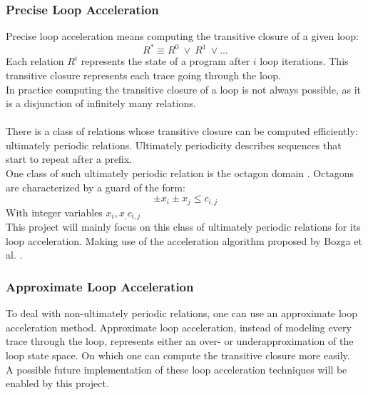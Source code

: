 \documentclass{article}
\begin{document}
\subsubsection{Precise Loop Acceleration}
Precise loop acceleration means computing the transitive closure of a given loop:
\begin{equation*}
	R^* \equiv R^0\ \lor\ R^1\ \lor ...
\end{equation*}
Each relation $R^i$ represents the state of a program after $i$ loop iterations. 
This transitive closure represents each trace going through the loop. \\
In practice computing the transitive closure of a loop is not always possible, as it is a disjunction of infinitely many relations. \\ \\
There is a class of relations whose transitive closure can be computed efficiently: ultimately periodic relations.
Ultimately periodicity describes sequences that start to repeat after a prefix. \\
One class of such ultimately periodic relation is the octagon domain \cite{DBLP:journals/corr/abs-cs-0703084}. Octagons are characterized by a guard of the form:
\begin{equation*}
	\pm x_i \pm x_j \leq c_{i,j}
\end{equation*}
With integer variables $x_i, x_, c_{i,j}$ \\
This project will mainly focus on this class of ultimately periodic relations for its loop acceleration. Making use of the acceleration algorithm proposed by Bozga et al. \cite{10.1007/978-3-642-14295-6_23}.

\subsubsection{Approximate Loop Acceleration}
To deal with non-ultimately periodic relations, one can use an approximate loop acceleration method. Approximate loop acceleration, instead of modeling every trace through the loop, represents either an over- or underapproximation of the loop state space. On which one can compute the transitive closure more easily. \\
A possible future implementation of these loop acceleration techniques will be enabled by this project.
\end{document}
